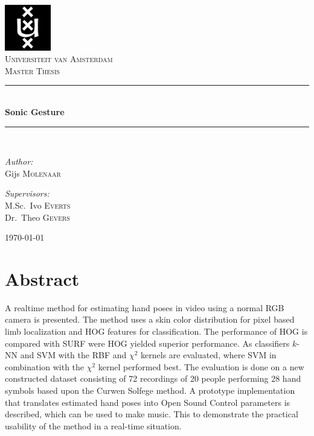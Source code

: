 \documentclass[a4paper, 11pt]{book}
\newcommand{\HRule}{\rule{\linewidth}{0.5mm}}
\begin{document}

\begin{titlepage}
\begin{center}

\includegraphics[width=0.15\textwidth]{./figures/uva.png}\\[1cm]
\textsc{\LARGE Universiteit van Amsterdam}\\[1.5cm]
\textsc{\Large Master Thesis}\\[0.5cm]

\HRule \\[0.4cm]
{ \huge \bfseries Sonic Gesture}\\[0.4cm]

\HRule \\[1.5cm]

\begin{minipage}{0.4\textwidth}
\begin{flushleft} \large
\emph{Author:}\\
Gijs \textsc{Molenaar}
\end{flushleft}
\end{minipage}
\begin{minipage}{0.4\textwidth}
\begin{flushright} \large
\emph{Supervisors:} \\
M.Sc.~Ivo \textsc{Everts} \\
Dr.~Theo \textsc{Gevers}
\end{flushright}
\end{minipage}

\vfill

{\large \today}

\end{center}
\end{titlepage}


\chapter*{Abstract}
A real\-time method for estimating hand poses in video using a normal RGB camera is presented. The method uses a skin color distribution for pixel based limb localization and HOG features for classification. The performance of HOG is compared with SURF were HOG yielded superior performance. As classifiers $k$-NN and SVM with the RBF and $\chi^2$ kernels are evaluated, where SVM in combination with the $\chi^2$ kernel performed best. The evaluation is done on a new constructed dataset consisting of 72 recordings of 20 people performing 28 hand symbols based upon the Curwen Solfege method. A prototype implementation that translates estimated hand poses into Open Sound Control parameters is described, which can be used to make music. This to demonstrate the practical usability of the method in a real-time situation.
\end{document}
